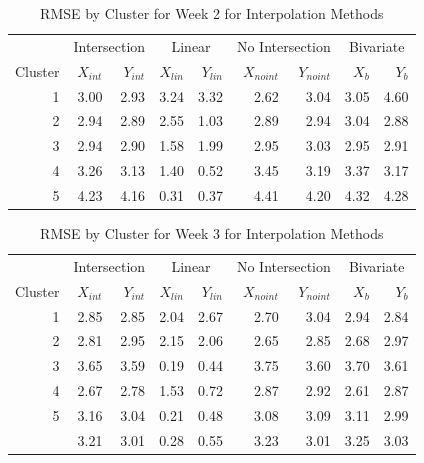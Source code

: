\documentclass[12pt]{article}
\begin{document}
\begin{table}

\caption{\label{tab:results-clust2-actual}RMSE by Cluster for Week 2 for Interpolation Methods}
\centering
\begin{tabular}[t]{rrrrrrrrr}
\toprule
\multicolumn{1}{c}{ } & \multicolumn{2}{c}{Intersection} & \multicolumn{2}{c}{Linear} & \multicolumn{2}{c}{No Intersection} & \multicolumn{2}{c}{Bivariate} \\
\cmidrule(l{3pt}r{3pt}){2-3} \cmidrule(l{3pt}r{3pt}){4-5} \cmidrule(l{3pt}r{3pt}){6-7} \cmidrule(l{3pt}r{3pt}){8-9}
Cluster & $X_{int}$ & $Y_{int}$ & $X_{lin}$ & $Y_{lin}$ & $X_{noint}$ & $Y_{noint}$ & $X_b$ & $Y_b$\\
\midrule
1 & 3.00 & 2.93 & 3.24 & 3.32 & 2.62 & 3.04 & 3.05 & 4.60\\
2 & 2.94 & 2.89 & 2.55 & 1.03 & 2.89 & 2.94 & 3.04 & 2.88\\
3 & 2.94 & 2.90 & 1.58 & 1.99 & 2.95 & 3.03 & 2.95 & 2.91\\
4 & 3.26 & 3.13 & 1.40 & 0.52 & 3.45 & 3.19 & 3.37 & 3.17\\
5 & 4.23 & 4.16 & 0.31 & 0.37 & 4.41 & 4.20 & 4.32 & 4.28\\
\bottomrule
\end{tabular}
\end{table}

\begin{table}

\caption{\label{tab:results-clust3-actual}RMSE by Cluster for Week 3 for Interpolation Methods}
\centering
\begin{tabular}[t]{rrrrrrrrr}
\toprule
\multicolumn{1}{c}{ } & \multicolumn{2}{c}{Intersection} & \multicolumn{2}{c}{Linear} & \multicolumn{2}{c}{No Intersection} & \multicolumn{2}{c}{Bivariate} \\
\cmidrule(l{3pt}r{3pt}){2-3} \cmidrule(l{3pt}r{3pt}){4-5} \cmidrule(l{3pt}r{3pt}){6-7} \cmidrule(l{3pt}r{3pt}){8-9}
Cluster & $X_{int}$ & $Y_{int}$ & $X_{lin}$ & $Y_{lin}$ & $X_{noint}$ & $Y_{noint}$ & $X_b$ & $Y_b$\\
\midrule
1 & 2.85 & 2.85 & 2.04 & 2.67 & 2.70 & 3.04 & 2.94 & 2.84\\
2 & 2.81 & 2.95 & 2.15 & 2.06 & 2.65 & 2.85 & 2.68 & 2.97\\
3 & 3.65 & 3.59 & 0.19 & 0.44 & 3.75 & 3.60 & 3.70 & 3.61\\
4 & 2.67 & 2.78 & 1.53 & 0.72 & 2.87 & 2.92 & 2.61 & 2.87\\
5 & 3.16 & 3.04 & 0.21 & 0.48 & 3.08 & 3.09 & 3.11 & 2.99\\
\addlinespace
6 & 3.21 & 3.01 & 0.28 & 0.55 & 3.23 & 3.01 & 3.25 & 3.03\\
\bottomrule
\end{tabular}
\end{table}
\end{document}
